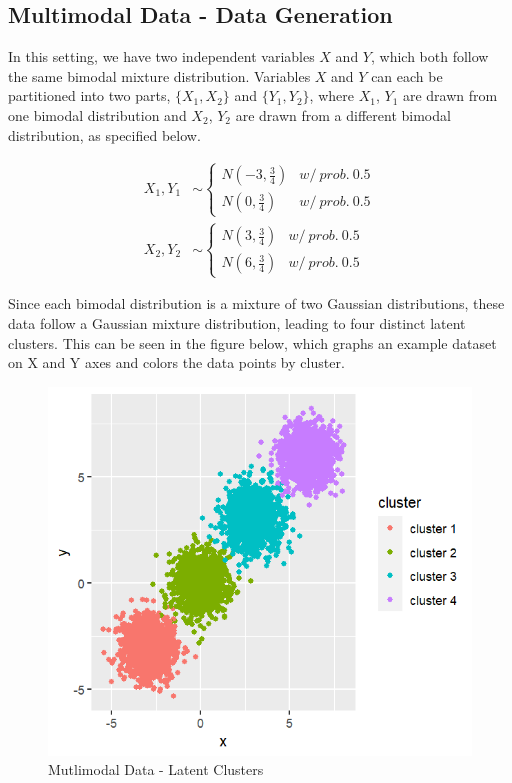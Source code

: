 \documentclass[
]{article}
\begin{document}
\hypertarget{multimodal-data---data-generation}{%
\subsection{Multimodal Data - Data
Generation}\label{multimodal-data---data-generation}}

In this setting, we have two independent variables \(X\) and \(Y\),
which both follow the same bimodal mixture distribution. Variables \(X\)
and \(Y\) can each be partitioned into two parts, \(\{X_1, X_2\}\) and
\(\{Y_1, Y_2\}\), where \(X_1\), \(Y_1\) are drawn from one bimodal
distribution and \(X_2\), \(Y_2\) are drawn from a different bimodal
distribution, as specified below.

\begin{align*}
  X_1, Y_1 & \sim 
  \begin{cases}
    N(-3, \frac{3}{4}) & w/\ prob.\ 0.5 \\
    N(0, \frac{3}{4}) & w/\ prob.\ 0.5
  \end{cases} \\
  X_2, Y_2 & \sim
  \begin{cases}
    N(3, \frac{3}{4}) & w/\ prob.\ 0.5 \\
    N(6, \frac{3}{4}) & w/\ prob.\ 0.5
  \end{cases}
\end{align*}

Since each bimodal distribution is a mixture of two Gaussian
distributions, these data follow a Gaussian mixture distribution,
leading to four distinct latent clusters. This can be seen in the figure
below, which graphs an example dataset on X and Y axes and colors the
data points by cluster.

\begin{figure}
\centering
\includegraphics{report_image/multimodal_clusters.png}
\caption{Mutlimodal Data - Latent Clusters}
\end{figure}
\end{document}
